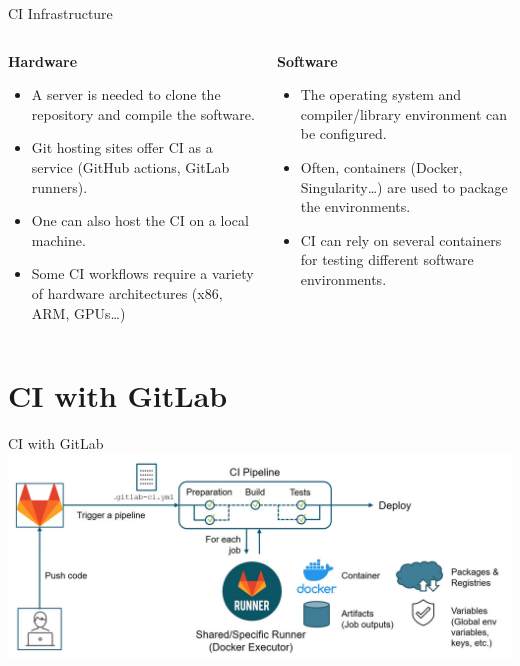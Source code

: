 \documentclass{setbeamer}
\begin{document}
\begin{frame}[c]{CI Infrastructure}
    \begin{columns}[T]
        \begin{column}{0.5\textwidth}
            \textbf{Hardware}\\
            \begin{itemize}
            \item 
            A server is needed to clone the repository and compile the software.
            \item
            Git hosting sites offer CI as a service (GitHub actions, GitLab runners).
            \item 
            One can also host the CI on a local machine.
            \item 
            Some CI workflows require a variety of hardware architectures (x86, ARM, GPUs\dots)
            \end{itemize}
        \end{column}

        \begin{column}{0.5\textwidth}
            \textbf{Software}\\
            \begin{itemize}
            \item 
            The operating system and compiler/library environment can be configured.
            \item
            Often, containers (Docker, Singularity\dots) are used to package the environments.
            \item 
            CI can rely on several containers for testing different software environments.
            \end{itemize}
        \end{column}
    \end{columns}
\end{frame}

\section{CI with GitLab}

\begin{frame}[c]{CI with GitLab}
	\centering
    \includegraphics[width=15cm]{resources/ci-gitlab}
\end{frame}
\end{document}
